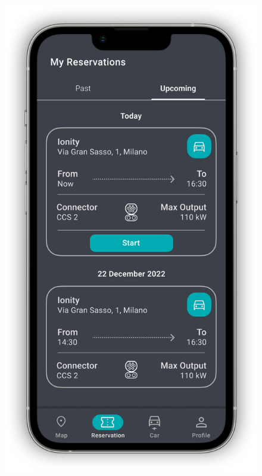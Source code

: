 \begin{figure}[H]
{        \includegraphics[scale=0.32]{src/mockups/reservations.png}
    }
    \subfloat[Profile]{
}
\end{figure}
